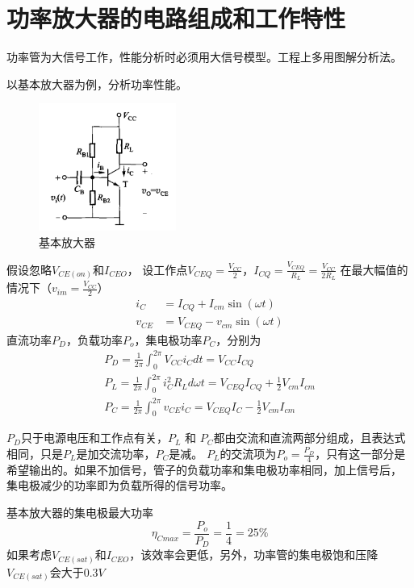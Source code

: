 \documentclass[10pt]{article}
\begin{document}
\section{功率放大器的电路组成和工作特性}
功率管为大信号工作，性能分析时必须用大信号模型。工程上多用图解分析法。
\begin{example}
    以基本放大器为例，分析功率性能。
\begin{figure}[H] %
 \centering %
 \includegraphics[width=0.4\textwidth]{pictures/2-2.png} %
 \caption{基本放大器} %
 \label{fig.1-1} %
 \end{figure}
假设忽略$V_{CE(on)}$和$I_{CEO}$，
设工作点$V_{CEQ} = \frac{V_{CC}}{2}$，$I_{CQ} = \frac{V_{CEQ}}{R_L} = \frac{V_{CC}}{2R_L}$ 
在最大幅值的情况下（$v_{im} = \frac{V_{CC}}{2}$）
\begin{align*}
    i_C &= I_{CQ} + I_{cm}\sin(\omega t) \\
    v_{CE} &= V_{CEQ} - v_{cm}\sin(\omega t)
\end{align*}
直流功率$P_D$，负载功率$P_o$，集电极功率$P_C$，分别为
\begin{align}
P_D = \frac{1}{2\pi}\int_{0}^{2\pi}V_{CC}i_{C}dt = V_{CC}I_{CQ}\\
P_L = \frac{1}{2\pi}\int_{0}^{2\pi}i_{C}^2R_L d\omega t  = V_{CEQ}I_{CQ}+\frac{1}{2}V_{cm}I_{cm}\\
P_C =  \frac{1}{2\pi}\int_{0}^{2\pi} v_{CE}i_{C} = V_{CEQ}I_{C}-\frac{1}{2}V_{cm}I_{cm}
\end{align}
\end{example}

$P_D$只于电源电压和工作点有关，$P_L$ 和 $P_C$都由交流和直流两部分组成，且表达式相同，只是$P_L$是加交流功率，$P_C$是减。
$P_L$的交流项为$P_o = \frac{P_D}{4}$，只有这一部分是希望输出的。如果不加信号，管子的负载功率和集电极功率相同，加上信号后，
集电极减少的功率即为负载所得的信号功率。\par
基本放大器的集电极最大功率
$$
\eta_{Cmax} = \frac{P_o}{P_D} = \frac{1}{4} = 25\%
$$
如果考虑$V_{CE(sat)}$和$I_{CEO}$，该效率会更低，另外，功率管的集电极饱和压降$V_{CE(sat)}$会大于$0.3V$
\newpage
\end{document}

